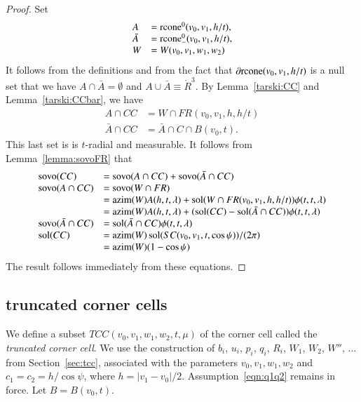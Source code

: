 \begin{proof}
Set
$$
 \begin{array}{lll}
 A &= {\operatorname{rcone}}^0(v_0,v_1,h/t),\\
  \bar A &= {\operatorname{rcone}}^0_-(v_0,v_1,h/t),\\
 W &= W(v_0,v_1,w_1,w_2)\\
 \end{array}
$$
It follows from the definitions and from the
fact that $\partial{\operatorname{rcone}}(v_0,v_1,h/t)$
is a null set that
we have $A\cap \bar A = \emptyset$ and 
$A\cup \bar A \equiv \ring{R}^3$.
By Lemma~\ref{tarski:CC} and Lemma~\ref{tarski:CCbar}, we have 
$$
  \begin{array}{lll}
    A\cap CC &= W \cap FR(v_0,v_1,h,h/t)\\
    \bar A \cap CC &= \bar A \cap C \cap B(v_0,t).
  \end{array}
$$
This last set is
is $t$-radial and measurable.
It follows from Lemma~\ref{lemma:sovoFR} that
$$
  \begin{array}{lll}
  {\operatorname{sovo}}(CC) &= {\operatorname{sovo}}(A\cap CC) + {\operatorname{sovo}}(\bar A\cap CC)\\
  {\operatorname{sovo}}(A\cap CC) &= {\operatorname{sovo}}(W\cap FR) \\
     &= {\operatorname{azim}}(W) A(h,t,\lambda) + \operatorname{sol}(W\cap FR(v_0,v_1,h,h/t))\phi(t,t,\lambda)\\
  &={\operatorname{azim}}(W) A(h,t,\lambda) + (\operatorname{sol}(CC)-\operatorname{sol}(\bar A \cap CC))\phi(t,t,\lambda)\\
  {\operatorname{sovo}}(\bar A \cap CC) &= \operatorname{sol}(\bar A \cap CC)\phi(t,t,\lambda)\\
  \operatorname{sol}(CC) &= {\operatorname{azim}}(W) \operatorname{sol}(SC(v_0,v_1,t,\cos\psi))/(2\pi) \\
         &={\operatorname{azim}}(W) (1-\cos\psi)\\
  \end{array}
$$
The result follows immediately from these equations.
\end{proof}

\subsection{truncated corner cells}



We define a subset $TCC(v_0,v_1,w_1,w_2,t,\mu)$ of the corner cell
called
the {\it truncated corner cell}.  
We use the construction of $b_i$, $u_i$, $p_i$, $q_i$, $R_i$,
$W_1$, $W_2$, $W''$, $\ldots$ from Section~\ref{sec:tcc},
associated with the parameters $v_0,v_1,w_1,w_2$ and
$c_1=c_2 = h/\cos\psi$, where $h = |v_1-v_0|/2$.  
Assumption~\ref{eqn:q1q2} remains
in force.  Let $B  = B(v_0,t)$.

